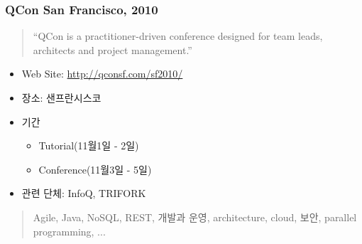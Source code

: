 \begin{frame}
\frametitle{QCon San Francisco, 2010}

\begin{quote}
``QCon is a practitioner-driven conference designed for team leads, architects and project management.''
\end{quote}

\begin{itemize}
  \item Web Site: \url{http://qconsf.com/sf2010/}
  \item 장소: 샌프란시스코
  \item 기간
    \begin{itemize}
    \item Tutorial(11월1일 - 2일)
    \item Conference(11월3일 - 5일)
    \end{itemize}
  \item 관련 단체: InfoQ, TRIFORK
\end{itemize}

\begin{quote}
Agile, Java, NoSQL, REST, 개발과 운영, architecture, cloud, 보안, parallel programming, ...
\end{quote}

\end{frame}
